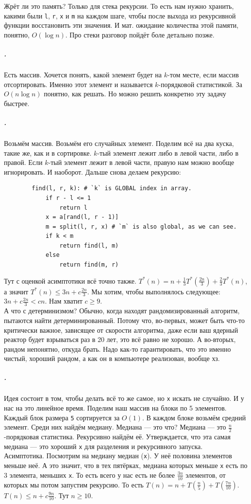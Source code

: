 \documentclass{article}
\newcommand{\pseudo}{PseudoLexer.py:PseudoLexer -x}
\newcommand{\pseudocode}[1]{\texttt{#1}}
\begin{document}
    Жрёт ли это память? Только для стека рекурсии. То есть нам нужно хранить, какими были \pseudocode{l}, \pseudocode{r}, \pseudocode{x} и \pseudocode{m} на каждом шаге, чтобы после выхода из рекурсивной функции восстановить эти значения. И мат. ожидание количества этой памяти, понятно, $O(\log n)$. Про стеки разговор пойдёт боле детально позже.
    \subparagraph{.}
    Есть массив. Хочется понять, какой элемент будет на $k$-том месте, если массив отсортировать. Именно этот элемент и называется $k$-порядковой статистикой. За $O(n\log n)$ понятно, как решать. Но можно решить конкретно эту задачу быстрее.
    \subparagraph{.}
    Возьмём массив. Возьмём его случайных элемент. Поделим всё на два куска, такие же, как и в сортировке. $k$-тый элемент лежит либо в левой части, либо в правой. Если $k$-тый элемент лежит в левой части, правую нам можно вообще игнорировать. И наоборот. Дальше снова делаем рекурсию:
    \begin{verbatim}
        find(l, r, k): # `k` is GLOBAL index in array.
            if r - l <= 1
                return l
            x = a[rand(l, r - 1)]
            m = split(l, r, x) # `m` is also global, as we can see.
            if k < m
                return find(l, m)
            else
                return find(m, r)
    \end{verbatim}
    Тут с оценкой асимптотики всё точно также. $T^*(n)=n+\frac13T^*\left(\frac{2n}3\right)+\frac23T^*(n)$, а значит $T^*(n)\leqslant3n+c\frac{2n}3$. Мы хотим, чтобы выполнялось следующее: $3n+c\frac{2n}3<cn$. Нам хватит $c\geqslant9$.\\
    А что с детерминизмом? Обычно, когда находят рандомизированный алгоритм, пытаются найти детерминированный. Потому что, во-первых, может быть что-то критически важное, зависящее от скорости алгоритма, даже если ваш ядерный реактор будет взрываться раз в 20 лет, это всё равно не хорошо. А во-вторых, рандом непонятно, откуда брать. Надо как-то гарантировать, что это именно чистый, хороший рандом, а как он в компьютере реализован, вообще хз.
    \subparagraph{.}
    Идея состоит в том, чтобы делать всё то же самое, но \pseudocode{x} искать не случайно. И у нас на это линейное время. Поделим наш массив на блоки по 5 элементов. Каждый блок размера \pseudocode{5} сортируется за $O(1)$. В каждом блоке возьмём средний элемент. Среди них найдём медиану. Медиана --- это что? Медиана --- это $\frac n2$-порядковая статистика. Рекурсивно найдём её. Утверждается, что эта самая медиана --- это хороший \pseudocode{x} для разделения и рекурсивного запуска.\\
    Асимптотика. Посмотрим на медиану медиан (\pseudocode{x}). У неё половина элементов меньше неё. А это значит, что в тех пятёрках, медиана которых меньше \pseudocode{x} есть по 3 элемента, меньших \pseudocode{x}. То есть всего у нас есть не более $\frac{3n}{10}$ элементов, от которых мы потом запустим рекурсию. То есть $T(n)=n+T\left(\frac n5\right)+T\left(\frac{7n}{10}\right)$. $T(n)\leqslant n+c\frac{9n}{10}$. Тут $n\geqslant10$.
\end{document}
